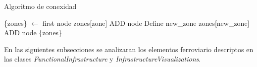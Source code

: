     \begin{algorithm}[H]
        \caption{Algoritmo de conexidad}
        \label{alg:connectedness}
        \begin{algorithmic}
            \STATE \{zones\} $\gets$ first node
                            \STATE zones[zone] ADD node
                        \ELSE
                            \STATE Define new\_zone
                            \STATE zones[new\_zone] ADD node
                        \ENDIF
                    \ENDIF
                \ENDFOR
            \ENDFOR 
            \OUTPUT \{zones\}   
        \end{algorithmic}
    \end{algorithm}
        
    En las siguientes subsecciones se analizaran los elementos ferroviario descriptos en las clases \textit{FunctionalInfrastructure} y \textit{InfrastructureVisualizations}.